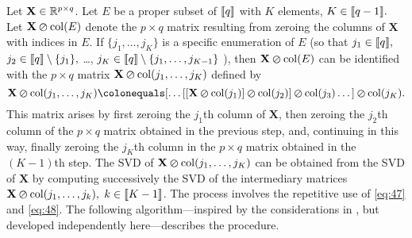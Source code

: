 \documentclass[11pt,a4paper]{article}
\DeclarePairedDelimiter\Brackets{\llbracket}{\rrbracket}
\theoremstyle{break}
\numberwithin{dummy}{section}
\theoremstyle{plain}
\theoremstyle{plain}
\theoremstyle{plain}
\theoremstyle{plain}
\theoremstyle{plain}
\theoremstyle{MyNonumberplain}
\newcommand{\0}{\M{0}}
\newcommand{\M}[1]{\mathbf{#1}}
\newcommand{\R}{\mathbb{R}}
\newcommand{\Mat}[2]{%
  \ifthenelse{\equal{#2}{1}}
  {\R^{#1}}
  {\R^{#1 \times #2}}
}
\newcommand{\zercol}[2]{\M{#1} \varoslash \mathrm{col}(#2)}
\begin{document}
Let $\M{X} \in \Mat{p}{q}$. Let $E$ be a proper subset of $\Brackets{q}$ with $K$ elements,
\begin{math}
  K \in \Brackets{q - 1}.
\end{math}
Let
\begin{math}
  \zercol{X}{E}
\end{math}
denote the $p \times q$ matrix resulting from zeroing the columns of $\M{X}$ with indices in $E$. If $\{j_1, \dots, j_K\}$ is a specific enumeration of $E$ (so that
\begin{math}
  j_1 \in \Brackets{q},
\end{math}
\begin{math}
  j_2 \in \Brackets{q} \setminus \{j_1\},
\end{math}
\dots,
\begin{math}
  j_K \in \Brackets{q} \setminus \{j_1, \dots, j_{K-1}\}
\end{math}%
), then
\begin{math}
  \zercol{X}{E}
\end{math}
can be identified with the $p \times q$ matrix
\begin{math}
  \zercol{X}{j_1, \dots, j_K}
\end{math}
defined by
\begin{displaymath}
  \zercol{X}{j_1, \dots, j_K}
  \colonequals
  [ \dots [[\zercol{X}{j_1}] \varoslash \mathrm{col}(j_2)]
   \varoslash \mathrm{col}(j_3)
  \dots ]
  \varoslash \mathrm{col}(j_K).
\end{displaymath}
This matrix arises by first zeroing the $j_1$th column of $\M{X}$, then zeroing the $j_2$th column of the $p \times q$ matrix obtained in the previous step, and, continuing in this way, finally zeroing the $j_K$th column in the $p \times q$ matrix obtained in the $(K-1)$th step.  The SVD of
\begin{math}
  \zercol{X}{j_1, \dots, j_K}
\end{math}
can be obtained from the SVD of $\M{X}$ by computing successively the SVD of the intermediary matrices
\begin{math}
  \zercol{X}{j_1, \dots, j_k},
\end{math}
$k \in \Brackets{K-1}$.  The process involves the repetitive use of \eqref{eq:47} and \eqref{eq:48}. The following algorithm---inspired by the considerations in \cite{brand06:_fast}, but developed independently here---describes the procedure.

\end{document}
